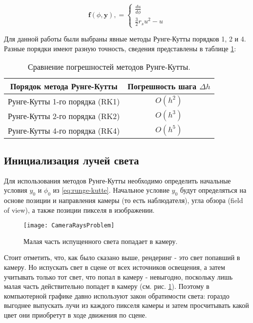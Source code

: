\begin{equation*}
\label{eq:runge-kutte_f}
    \mathbf{f}(\phi, \mathbf{y}), =
    \begin{cases}
        \frac{du}{d\phi}
        \\
        \frac{3}{2}r_su^2 - u
    \end{cases}
\end{equation*}

Для данной работы были выбраны явные методы Рунге-Кутты порядков 1, 2 и 4. Разные порядки имеют разную точность, сведения представлены в таблице \ref{tab:runge-kutte}:

\begin{center}
    \begin{table}[h!]
        \centering
        \begin{tabular}{|c|c|}
            \hline
            Порядок метода Рунге-Кутты & Погрешность шага $\Delta h$ \\
            \hline
            Рунге-Кутты 1-го порядка (RK1) & $O(h^2)$ \\
            \hline
            Рунге-Кутты 2-го порядка (RK2) & $O(h^3)$ \\
            \hline
            Рунге-Кутты 4-го порядка (RK4) & $O(h^5)$ \\
            \hline
        \end{tabular}
        \caption{Сравнение погрешностей методов Рунге-Кутты.}
        \label{tab:runge-kutte}
    \end{table}
\end{center}


\subsection{Инициализация лучей света}
\label{subsec:ray_init}

Для использования методов Рунге-Кутты необходимо определить начальные условия $y_0$ и $\phi_0$ из \eqref{eq:runge-kutte}. Начальное условие $y_0$ будут определяться на основе позиции и направления камеры (то есть наблюдателя), угла обзора (field of view), а также позиции пикселя в изображении.

\begin{figure}[h]
    \centering
    \texttt{[image: CameraRaysProblem]}
    \caption{Малая часть испущенного света попадает в камеру.}
    \label{fig:camera_rays_problem}
\end{figure}

Стоит отметить, что, как было сказано выше, рендеринг - это свет попавший в камеру. Но испускать свет в сцене от всех источников освещения, а затем учитывать только тот свет, что попал в камеру - невыгодно, поскольку лишь малая часть действительно попадет в камеру (см. рис. \ref{fig:camera_rays_problem}). Поэтому в компьютерной графике давно используют закон обратимости света: гораздо выгоднее выпускать лучи из каждого пикселя камеры и затем просчитывать какой цвет они приобретут в ходе движения по сцене.


